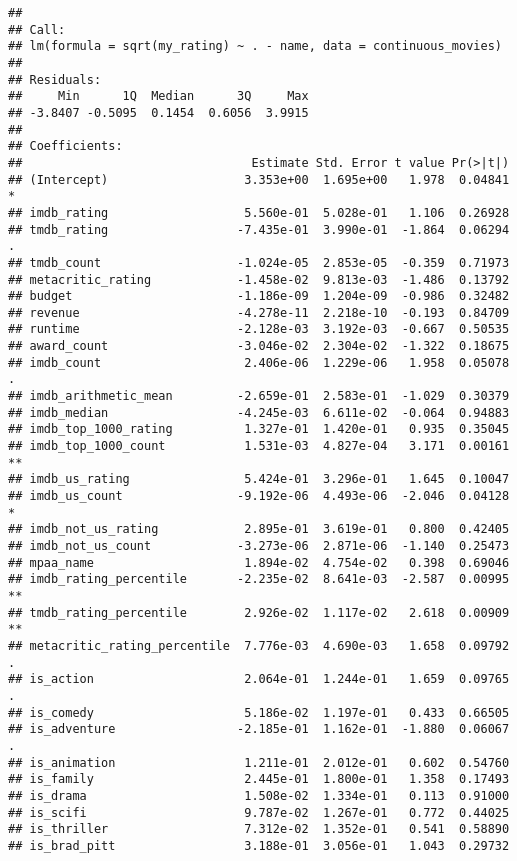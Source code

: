 \documentclass[
]{article}
\begin{document}
\begin{verbatim}
## 
## Call:
## lm(formula = sqrt(my_rating) ~ . - name, data = continuous_movies)
## 
## Residuals:
##     Min      1Q  Median      3Q     Max 
## -3.8407 -0.5095  0.1454  0.6056  3.9915 
## 
## Coefficients:
##                                Estimate Std. Error t value Pr(>|t|)   
## (Intercept)                   3.353e+00  1.695e+00   1.978  0.04841 * 
## imdb_rating                   5.560e-01  5.028e-01   1.106  0.26928   
## tmdb_rating                  -7.435e-01  3.990e-01  -1.864  0.06294 . 
## tmdb_count                   -1.024e-05  2.853e-05  -0.359  0.71973   
## metacritic_rating            -1.458e-02  9.813e-03  -1.486  0.13792   
## budget                       -1.186e-09  1.204e-09  -0.986  0.32482   
## revenue                      -4.278e-11  2.218e-10  -0.193  0.84709   
## runtime                      -2.128e-03  3.192e-03  -0.667  0.50535   
## award_count                  -3.046e-02  2.304e-02  -1.322  0.18675   
## imdb_count                    2.406e-06  1.229e-06   1.958  0.05078 . 
## imdb_arithmetic_mean         -2.659e-01  2.583e-01  -1.029  0.30379   
## imdb_median                  -4.245e-03  6.611e-02  -0.064  0.94883   
## imdb_top_1000_rating          1.327e-01  1.420e-01   0.935  0.35045   
## imdb_top_1000_count           1.531e-03  4.827e-04   3.171  0.00161 **
## imdb_us_rating                5.424e-01  3.296e-01   1.645  0.10047   
## imdb_us_count                -9.192e-06  4.493e-06  -2.046  0.04128 * 
## imdb_not_us_rating            2.895e-01  3.619e-01   0.800  0.42405   
## imdb_not_us_count            -3.273e-06  2.871e-06  -1.140  0.25473   
## mpaa_name                     1.894e-02  4.754e-02   0.398  0.69046   
## imdb_rating_percentile       -2.235e-02  8.641e-03  -2.587  0.00995 **
## tmdb_rating_percentile        2.926e-02  1.117e-02   2.618  0.00909 **
## metacritic_rating_percentile  7.776e-03  4.690e-03   1.658  0.09792 . 
## is_action                     2.064e-01  1.244e-01   1.659  0.09765 . 
## is_comedy                     5.186e-02  1.197e-01   0.433  0.66505   
## is_adventure                 -2.185e-01  1.162e-01  -1.880  0.06067 . 
## is_animation                  1.211e-01  2.012e-01   0.602  0.54760   
## is_family                     2.445e-01  1.800e-01   1.358  0.17493   
## is_drama                      1.508e-02  1.334e-01   0.113  0.91000   
## is_scifi                      9.787e-02  1.267e-01   0.772  0.44025   
## is_thriller                   7.312e-02  1.352e-01   0.541  0.58890   
## is_brad_pitt                  3.188e-01  3.056e-01   1.043  0.29732   

\end{verbatim}
\end{document}
